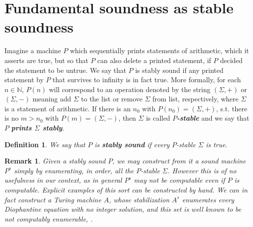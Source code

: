 \documentclass{amsart}  %
\numberwithin{equation}{section}
\newtheorem{remark}[equation]{Remark}
\newtheorem{definition}[equation]{Definition}
\theoremstyle{definition}
\theoremstyle{remark}
\begin{document}
{\section {Fundamental soundness as stable soundness} \label{section:fundamentalSoundness}
Imagine a machine $P$ which sequentially prints statements of arithmetic, which it asserts are true, but so that $P$ can also delete a printed statement, if $P$ decided the statement to be untrue. We say that $P$ is stably sound if any printed statement by $P$ that survives to infinity is in fact true.  More formally, for each $n \in \mathbb{N}$, $P (n)$ will correspond to an operation denoted by the string $(\Sigma,+)$ or $(\Sigma,-)$ meaning add $\Sigma$ to the list or remove $\Sigma$ from list, respectively, where $\Sigma$ is a statement of arithmetic. 
If there is an $n  _{0} $  with $P (n _{0} ) = (\Sigma  ,+ )$, s.t. there is no $m>n _{0} $ with $P (m) = (\Sigma, -)$, then $\Sigma $ is called \textbf{\emph{$P$-stable}}  and we say that $P$ \textbf{\emph{prints $\Sigma$ stably}}. 
\begin{definition}
 We say that $P$ is \textbf{\emph{stably sound}}  if every  $P$-stable $\Sigma$ is true.
  \end{definition}
\begin{remark} \label{remark:stable} Given a stably sound $P$, we may construct from it a sound machine $P ^{s} $ simply by enumerating, in order, all the $P$-stable $\Sigma$. However this is of no usefulness in our context, as in general $P ^{s} $ may not be computable even if $P$ is computable.  Explicit examples of this sort can be constructed by hand. We can in fact construct a Turing machine $A$, whose stabilization $A ^{s} $ enumerates every Diophantine equation with no integer solution, and this set is well known to be not computably enumerable, \cite{TuringComputableNumbers}.
\end{remark}

}
\end{document}
